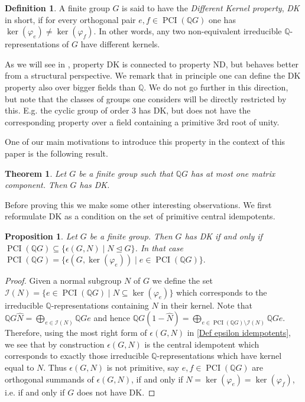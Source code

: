 \documentclass[a4paper,10pt]{amsart}
\newtheorem{proposition}[lemma]{Proposition}
\newtheorem{theorem}[lemma]{Theorem}
\theoremstyle{definition}
\newtheorem{definition}[lemma]{Definition}
\theoremstyle{remark}
\newcommand\PCI{\operatorname{PCI}}
\newcommand\mc{\mathcal}
\newcommand\wh{\widehat}
\newcommand{\Q}{{\mathbb Q}}
\begin{document}
\begin{definition}
A finite group $G$ is said to have the \emph{Different Kernel property}, \emph{DK} in short, if for every orthogonal pair $e,f \in \PCI(\Q G)$ one has $\ker(\varphi_e) \neq \ker(\varphi_f)$. In other words, any two non-equivalent irreducible $\mathbb{Q}$-representations of $G$ have different kernels.
\end{definition}

As we will see in , property DK is connected to property ND, but behaves better from a structural perspective. We remark that in principle one can define the DK property also over bigger fields than $\mathbb{Q}$. We do not go further in this direction, but note that the classes of groups one considers will be directly restricted by this. E.g. the cyclic group of order $3$ has DK, but does not have the corresponding property over a field containing a primitive 3rd root of unity.

One of our main motivations to introduce this property in the context of this paper is the following result.

\begin{theorem}\label{th:OMCImpliesDK}
Let $G$ be a finite group such that $\Q G$ has at most one matrix component. Then $G$ has DK.
\end{theorem}

Before proving this we make some other interesting observations.
We first reformulate DK as a condition on the set of primitive central idempotents.

\begin{proposition}\label{DK via epsilon}
Let $G$ be a finite group. Then $G$ has DK if and only if $\PCI(\Q G) \subseteq \{ \epsilon(G,N) \mid N \unlhd G \}$. In that case $\PCI(\Q G)  = \{  \epsilon(G,\ker(\varphi_e)) \mid e \in \PCI(\Q G) \}.$
\end{proposition}
\begin{proof}
Given a normal subgroup $N$ of $G$ we define the set $\mc{I}(N) = \{ e \in \PCI(\Q G) \mid N \subseteq \ker(\varphi_e) \}$ which corresponds to the irreducible $\Q$-representations containing $N$ in their kernel. Note that $\Q G \wh{N} = \bigoplus\limits_{e \in \mc{I}(N)} \Q G e$ and hence $\Q G (1 - \wh{N}) = \bigoplus\limits_{e \in \PCI(\Q G) \setminus \mc{I}(N)} \Q G e$.
Therefore, using the most right form of $\epsilon(G,N)$ in \eqref{Def epsilon idempotents}, we see that  by construction $\epsilon(G,N)$ is the central idempotent which corresponds to exactly those irreducible $\mathbb{Q}$-representations which have kernel equal to $N$. Thus $\epsilon(G,N)$ is not primitive, say $e, f \in \PCI(\Q G)$ are orthogonal summands of $\epsilon(G,N)$, if and only if $N = \ker(\varphi_e) = \ker(\varphi_f)$, i.e. if and only if $G$ does not have DK. 
\end{proof}
\end{document}
